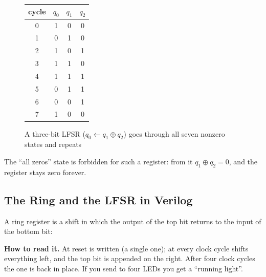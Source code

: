 \begin{figure}[H]
\centering
\begin{minipage}{0.55\textwidth}
\centering
{}
\end{minipage}\hfill
\begin{minipage}{0.4\textwidth}
\centering
\small
\begin{tabular}{c|ccc}
\toprule
cycle & $q_0$ & $q_1$ & $q_2$ \\
\midrule
0 & 1 & 0 & 0 \\
1 & 0 & 1 & 0 \\
2 & 1 & 0 & 1 \\
3 & 1 & 1 & 0 \\
4 & 1 & 1 & 1 \\
5 & 0 & 1 & 1 \\
6 & 0 & 0 & 1 \\
7 & 1 & 0 & 0 \\
\bottomrule
\end{tabular}
\end{minipage}
\caption{A three-bit LFSR ($q_0 \leftarrow q_1\oplus q_2$) goes through all seven
nonzero states and repeats}
\label{fig:lfsr}
\end{figure}

The ``all zeros'' state is forbidden for such a register: from it
$q_1\oplus q_2=0$, and the register stays zero forever.

\subsection{The Ring and the LFSR in Verilog}
\label{sec:regs-lfsr-v}

A ring register is a shift in which the output of the top bit returns to the
input of the bottom bit:


\textbf{How to read it.} At reset  is written (a single one); at every
clock cycle  shifts everything left, and the top bit is
appended on the right. After four clock cycles the one is back in place. If you
send  to four LEDs you get a ``running light''.

